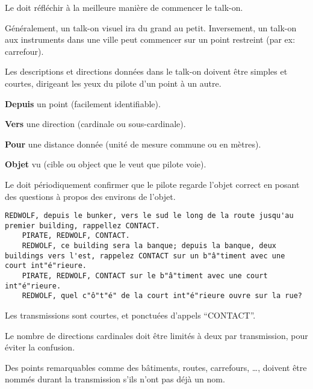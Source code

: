 \begin{e1}
\begin{e2}
\begin{e4}
			\item Le \ja{} doit réfléchir à la meilleure manière de commencer le talk-on.
			
			Généralement, un talk-on visuel ira du grand au petit. Inversement, un talk-on aux instruments dans une ville peut commencer sur un point restreint (par ex: carrefour).
			
			\item Les descriptions et directions données dans le talk-on doivent être simples et courtes, dirigeant les yeux du pilote d'un point à un autre.
			
			\begin{e5}
				
				\item \textbf{Depuis} un point (facilement identifiable).
				\item \textbf{Vers} une direction (cardinale ou sous-cardinale).
				\item \textbf{Pour} une distance donnée (unité de mesure commune ou en mètres).
				\item \textbf{Objet} vu (cible ou object que le \ja{} veut que pilote voie).
				
			\end{e5}
			
			Le \ja{} doit périodiquement confirmer que le pilote regarde l'objet correct en posant des questions à propos des environs de l'objet.
			
			\begin{minipage}{\linewidth}
				\begin{lstlisting}[caption=Corrélation: talk-on progressif, label=9ltalkonprogr]
	REDWOLF, depuis le bunker, vers le sud le long de la route jusqu'au premier building, rappellez CONTACT.
	PIRATE, REDWOLF, CONTACT.
	REDWOLF, ce building sera la banque; depuis la banque, deux buildings vers l'est, rappelez CONTACT sur un b"â"timent avec une court int"é"rieure.
	PIRATE, REDWOLF, CONTACT sur le b"â"timent avec une court int"é"rieure.
	REDWOLF, quel c"ô"t"é" de la court int"é"rieure ouvre sur la rue?
				\end{lstlisting}
			\end{minipage}
			
			Les transmissions sont courtes, et ponctuées d'appels ``CONTACT''.
			
			\item Le nombre de directions cardinales doit être limités à deux par transmission, pour éviter la confusion.
			
			\item Des points remarquables comme des bâtiments, routes, carrefours, \ldots, doivent être nommés durant la transmission s'ils n'ont pas déjà un nom.
			

\end{e4}
\end{e2}
\end{e1}
